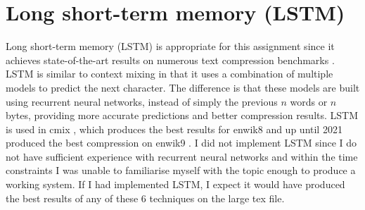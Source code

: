 \documentclass[a4paper, 11pt]{article}
\numberwithin{equation}{section}
\begin{document}
\section{Long short-term memory (LSTM)}
Long short-term memory (LSTM) is appropriate for this assignment since it achieves state-of-the-art 
results on numerous text compression benchmarks \cite{cmix,TextBenchmark}. 
LSTM is similar to context mixing in that it uses a combination of multiple models to predict the next character. 
The difference is that these models are built using recurrent neural networks, instead of 
simply the previous $n$ words or $n$ bytes, providing more accurate predictions and better compression results. 
LSTM is used in cmix \cite{cmix}, which produces the best results for enwik8 and up until 2021 \cite{bellard2021lossless} 
produced the best compression on enwik9 \cite{TextBenchmark}. 
I did not implement LSTM since I do not have sufficient experience with recurrent neural networks and within 
the time constraints I was unable to familiarise myself with the topic enough to produce a working system. 
If I had implemented LSTM, I expect it would have produced the best results of any of these 6 techniques 
on the large tex file. 




\end{document}
